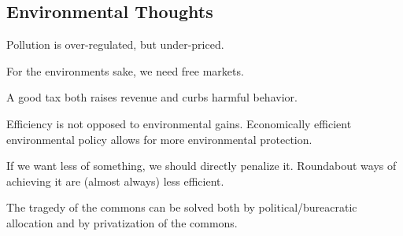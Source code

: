 \subsection{Environmental Thoughts}

\thought Pollution is over-regulated, but under-priced.

\thought For the environments sake, we need free markets.

\thought A good tax both raises revenue and curbs harmful behavior.

\thought Efficiency is not opposed to environmental gains. Economically
efficient environmental policy allows for more environmental protection.

\thought If we want less of something, we should directly penalize it.
Roundabout ways of achieving it are (almost always) less efficient.

\thought The tragedy of the commons can be solved both by political/bureacratic
allocation and by privatization of the commons.

